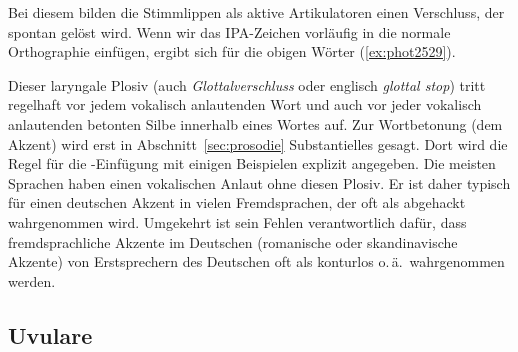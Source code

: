 
Bei diesem bilden die Stimmlippen als aktive Artikulatoren einen Verschluss, der spontan gelöst wird.
Wenn wir das IPA-Zeichen vorläufig in die normale Orthographie einfügen, ergibt sich für die obigen Wörter (\ref{ex:phot2529}).

\begin{exe}
  \ex\label{ex:phot2529}
  \begin{xlist}
  \end{xlist}
\end{exe}

Dieser laryngale Plosiv (auch \textit{Glottalverschluss} oder englisch \textit{glottal stop}) tritt regelhaft vor jedem vokalisch anlautenden Wort und auch vor jeder vokalisch anlautenden betonten Silbe innerhalb eines Wortes auf.
Zur Wortbetonung (dem Akzent) wird erst in Abschnitt~\ref{sec:prosodie} Substantielles gesagt.
Dort wird die Regel für die \textipa{[P]}-Einfügung mit einigen Beispielen explizit angegeben.
Die meisten Sprachen haben einen vokalischen Anlaut ohne diesen Plosiv.
Er ist daher typisch für einen deutschen Akzent in vielen Fremdsprachen, der oft als abgehackt wahrgenommen wird.
Umgekehrt ist sein Fehlen verantwortlich dafür, dass fremdsprachliche Akzente im Deutschen (\zB romanische oder skandinavische Akzente) von Erstsprechern des Deutschen oft als konturlos o.\,ä.\ wahrgenommen werden.

\subsection{Uvulare}


